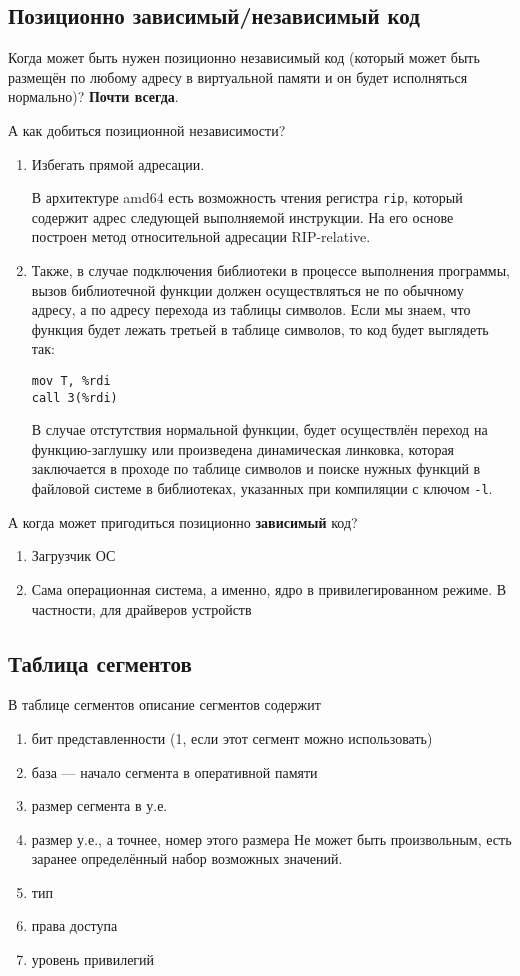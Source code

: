 \subsection{Позиционно зависимый/независимый код}

Когда может быть нужен позиционно независимый код (который может быть размещён по любому адресу в виртуальной памяти и он будет исполняться нормально)? \textbf{Почти всегда}.

А как добиться позиционной независимости?

\begin{enumerate}
\item Избегать прямой адресации.

В архитектуре amd64 есть возможность чтения регистра \verb!rip!, который содержит адрес следующей выполняемой инструкции. На его основе построен метод относительной адресации RIP-relative.


\item Также, в случае подключения библиотеки в процессе выполнения программы, вызов библиотечной функции должен осуществляться не по обычному адресу, а по адресу перехода из таблицы символов. Если мы знаем, что функция будет лежать третьей в таблице символов, то код будет выглядеть так:
\begin{verbatim}
mov T, %rdi
call 3(%rdi)
\end{verbatim}

В случае отстутствия нормальной функции, будет осуществлён переход на функцию-заглушку или произведена динамическая линковка, которая заключается в проходе по таблице символов и поиске нужных функций в файловой системе в библиотеках, указанных при компиляции с ключом \verb!-l!.
\end{enumerate}

А когда может пригодиться позиционно \textbf{зависимый} код?

\begin{enumerate}
\item Загрузчик ОС
\item Сама операционная система, а именно, ядро в привилегированном режиме. В частности, для драйверов устройств
\end{enumerate}

\subsection{Таблица сегментов}

В таблице сегментов описание сегментов содержит
\begin{enumerate}
\item бит представленности (1, если этот сегмент можно использовать)
\item база --- начало сегмента в оперативной памяти
\item размер сегмента в у.е.
\item размер у.е., а точнее, номер этого размера Не может быть произвольным, есть заранее определённый набор возможных значений.
\item тип
\item права доступа
\item уровень привилегий
\end{enumerate}

